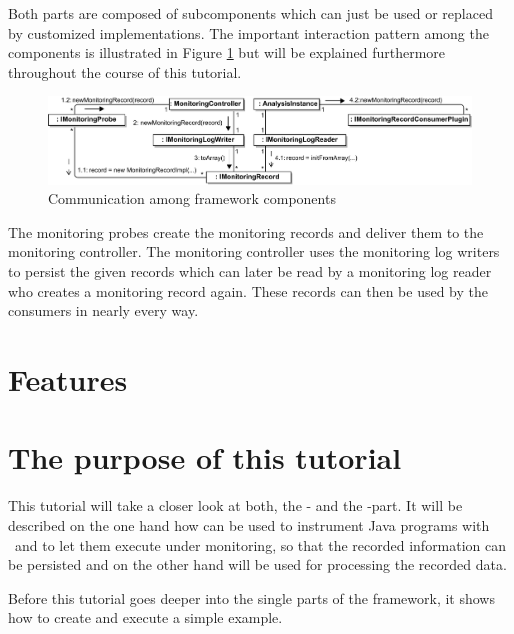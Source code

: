 \noindent Both parts are composed of subcomponents which can just be used or %
replaced by customized implementations. The important interaction pattern among %
the components is illustrated in Figure \ref{Figure:KiekerCommunicationDiagram} %
but will be explained furthermore throughout the course of this tutorial. %

\begin{figure}[H]\centering
\includegraphics[width=1\textwidth]{images/kiekerCommunications-revisedReArranged-woMonitoringLog-bw-newNames}
\caption{Communication among \Kieker{} framework components}
\label{Figure:KiekerCommunicationDiagram}
\end{figure}
		
\noindent\notify The monitoring probes create the monitoring records and deliver %
them to the monitoring controller. The monitoring controller uses the monitoring %
log writers to persist the given records which can later be read by a monitoring %
log reader who creates a monitoring record again. These records can then be used %
by the consumers in nearly every way.

\section{Features}
	
\section{The purpose of this tutorial}
This tutorial will take a closer look at both, the \KiekerMonitoringPart{}- and %
the \KiekerAnalysisPart-part. It will be described on the one hand how %
\KiekerMonitoringPart{}  can be used to instrument Java programs %
with \Kieker\ and to let them execute under monitoring, so that the recorded %
information can be persisted and on the other hand \KiekerAnalysisPart{} %
will be used for processing the recorded data.

Before this tutorial goes deeper into the single parts of the framework, it %
shows how to create and execute a simple example.
